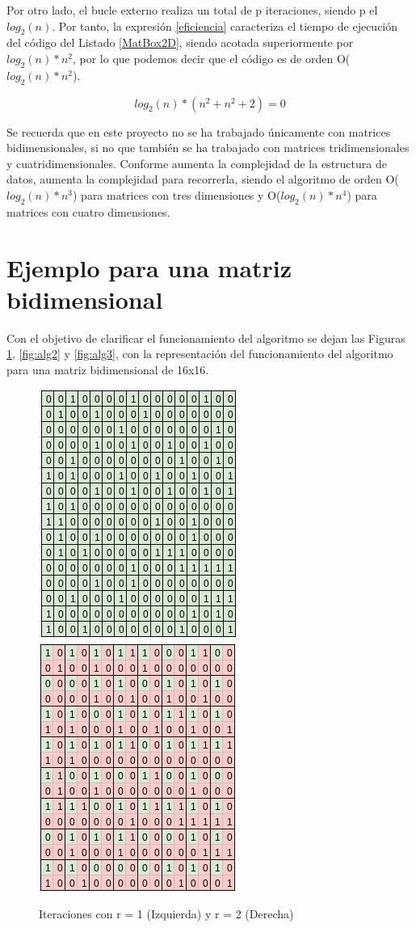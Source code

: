 Por otro lado, el bucle externo realiza un total de p iteraciones, siendo p el $log_2(n)$. Por tanto, la expresión \ref{eficiencia} caracteriza el tiempo de ejecución del código del Listado \ref{MatBox2D}, siendo acotada superiormente por $log_2(n)*n^2$, por lo que podemos decir que el código es de orden O( $log_2(n)*n^2$). 

\begin{equation}
    \label{eficiencia}
    log_2(n)*(n^2 + n^2 + 2) = 0
\end{equation}

Se recuerda que en este proyecto no se ha trabajado únicamente con matrices bidimensionales, si no que también se ha trabajado con matrices tridimensionales y cuatridimensionales. Conforme aumenta la complejidad de la estructura de datos, aumenta la complejidad para recorrerla, siendo el algoritmo de orden O($log_2(n)*n^3$) para matrices con tres dimensiones y O($log_2(n)*n^4$) para matrices con cuatro dimensiones.
\section{Ejemplo para una matriz bidimensional}
Con el objetivo de clarificar el funcionamiento del algoritmo se dejan las Figuras \ref{fig:alg1}, \ref{fig:alg2} y \ref{fig:alg3}, con la representación del funcionamiento del algoritmo para una matriz bidimensional de 16x16.

\begin{figure}[H]
    \centering
    \includegraphics[width=.24\textwidth]{img/ejemploAlgoritmo1.jpeg}
    \includegraphics[width=.24\textwidth]{img/ejemploAlgoritmo2.jpeg}
    \caption{Iteraciones con r = 1 (Izquierda) y r = 2 (Derecha)}
    \label{fig:alg1}
\end{figure}

